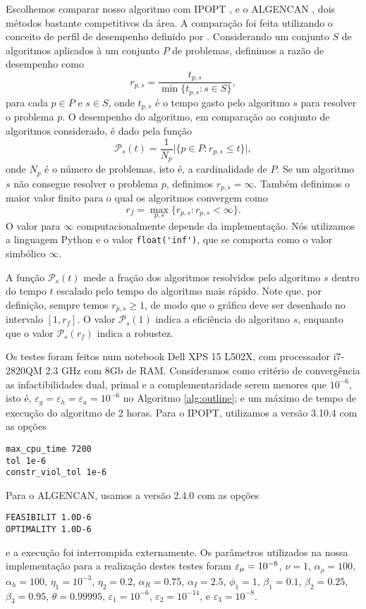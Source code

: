 Escolhemos comparar nosso algoritmo com IPOPT \cite{bib:ipopt}, 
e o ALGENCAN \cite{bib:algencan1,bib:algencan2}, dois métodos bastante
competitivos da área.
A comparação foi feita utilizando o conceito de perfil de desempenho definido
por \citet{bib:performance-profile}.
Considerando um conjunto $S$ de algoritmos aplicados à um conjunto $P$ de
problemas, definimos a razão de desempenho como
$$r_{p,s} = \frac{t_{p,s}}{\min\{t_{p,s} : s \in S\}},$$
para cada $p\in P$ e $s \in S$, onde $t_{p,s}$ é o tempo gasto pelo algoritmo
$s$ para resolver o problema $p$.
O desempenho do algoritmo, em comparação ao conjunto de algoritmos considerado, 
é dado pela função 
$$\mathcal{P}_s(t) = \frac{1}{N_p} \vert\{p \in P : r_{p,s} \leq t\}\vert,$$
onde $N_p$ é o número de problemas, isto é, a cardinalidade de $P$.
Se um algoritmo $s$ não consegue resolver o problema $p$, definimos $r_{p,s} =
\infty$. 
Também definimos o maior valor finito para o qual os algoritmos convergem como
$$r_f = \max_{p,s}\{r_{p,s} : r_{p,s} < \infty\}.$$
O valor para $\infty$ computacionalmente depende da implementação. Nós
utilizamos a linguagem Python e o valor \verb+float('inf')+, que se comporta
como o valor simbólico $\infty$.

A função $\mathcal{P}_s(t)$ mede a fração
dos algoritmos resolvidos pelo algoritmo $s$ dentro do tempo $t$ escalado pelo tempo do
algoritmo mais rápido.
Note que, por definição, sempre temos $r_{p,s} \geq 1$, de modo que
o gráfico deve ser desenhado no intervalo $[1,r_f]$.
O valor $\mathcal{P}_s(1)$ indica a eficiência do 
algoritmo $s$, enquanto que o valor $\mathcal{P}_s(r_f)$ indica a robustez.

Os testes foram feitos num notebook Dell XPS 15 L502X, com processador i7-2820QM
2.3 GHz com 8Gb de RAM. 
Consideramos como critério de convergência as infactibilidades dual, primal e a
complementaridade
serem menores que $10^{-6}$, isto é, $\varepsilon_g = \varepsilon_h =
\varepsilon_a = 10^{-6}$ no Algoritmo \ref{alg:outline}; e um máximo de tempo de
execução do algoritmo de 2 horas. Para o IPOPT, utilizamos a versão 3.10.4 com
as opções
\begin{lstlisting}[frame=single]
max_cpu_time 7200
tol 1e-6
constr_viol_tol 1e-6
\end{lstlisting}
Para o ALGENCAN, usamos a versão 2.4.0 com as opções
\begin{lstlisting}[frame=single]
FEASIBILIT 1.0D-6
OPTIMALITY 1.0D-6
\end{lstlisting}
e a execução foi interrompida externamente.
Os parâmetros utilizados na nossa implementação para a realização destes testes
foram
$\varepsilon_{\mu} = 10^{-6}$,
$\nu = 1$,
$\alpha_\rho = 100$,
$\alpha_h = 100$,
$\eta_1 = 10^{-3}$,
$\eta_2 = 0.2$,
$\alpha_R = 0.75$,
$\alpha_I = 2.5$,
$\phi_1 = 1$,
$\beta_1 = 0.1$,
$\beta_2 = 0.25$,
$\beta_3 = 0.95$,
$\theta = 0.99995$,
$\varepsilon_1 = 10^{-6}$,
$\varepsilon_2 = 10^{-14}$, e 
$\varepsilon_3 = 10^{-8}$.

